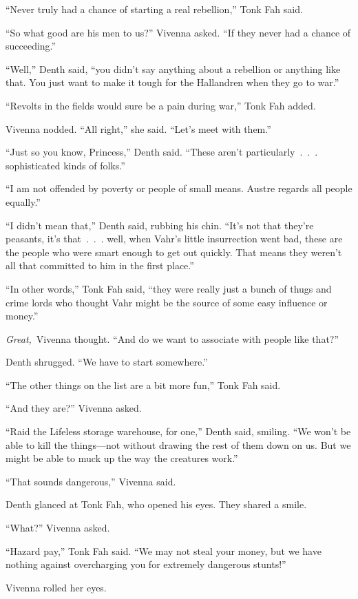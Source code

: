 “Never truly had a chance of starting a real rebellion,” Tonk Fah said.

“So what good are his men to us?” Vivenna asked. “If they never had a chance of succeeding.”

“Well,” Denth said, “you didn’t say anything about a rebellion or anything like that. You just want to make it tough for the Hallandren when they go to war.”

“Revolts in the fields would sure be a pain during war,” Tonk Fah added.

Vivenna nodded. “All right,” she said. “Let’s meet with them.”

“Just so you know, Princess,” Denth said. “These aren’t particularly~.~.~. sophisticated kinds of folks.”

“I am not offended by poverty or people of small means. Austre regards all people equally.”

“I didn’t mean that,” Denth said, rubbing his chin. “It’s not that they’re peasants, it’s that~.~.~. well, when Vahr’s little insurrection went bad, these are the people who were smart enough to get out quickly. That means they weren’t all that committed to him in the first place.”

“In other words,” Tonk Fah said, “they were really just a bunch of thugs and crime lords who thought Vahr might be the source of some easy influence or money.”

\textit{Great,}~Vivenna thought. “And do we want to associate with people like that?”

Denth shrugged. “We have to start somewhere.”

“The other things on the list are a bit more fun,” Tonk Fah said.

“And they are?” Vivenna asked.

“Raid the Lifeless storage warehouse, for one,” Denth said, smiling. “We won’t be able to kill the things—not without drawing the rest of them down on us. But we might be able to muck up the way the creatures work.”

“That sounds dangerous,” Vivenna said.

Denth glanced at Tonk Fah, who opened his eyes. They shared a smile.

“What?” Vivenna asked.

“Hazard pay,” Tonk Fah said. “We may not steal your money, but we have nothing against overcharging you for extremely dangerous stunts!”

Vivenna rolled her eyes.

